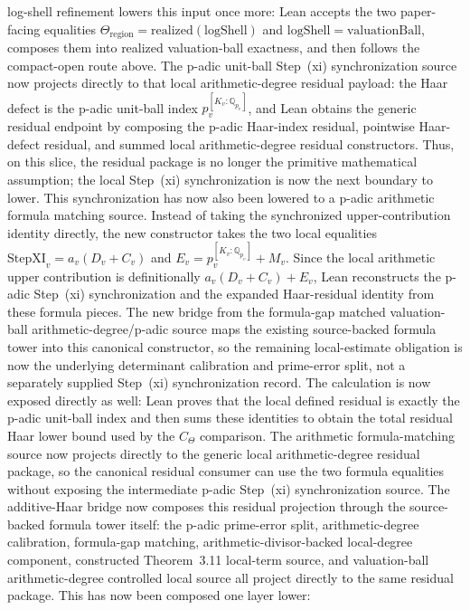 \documentclass[11pt]{article}
\theoremstyle{plain}
\theoremstyle{definition}
\theoremstyle{remark}
\begin{document}
log-shell refinement lowers this input once more: Lean accepts the two
paper-facing equalities
\(\Theta_{\mathrm{region}}=\mathrm{realized}(\mathrm{logShell})\) and
\(\mathrm{logShell}=\mathrm{valuationBall}\), composes them into realized
valuation-ball exactness, and then follows the compact-open route above.
The p-adic unit-ball Step~(xi) synchronization source now projects directly to
that local arithmetic-degree residual payload: the Haar defect is the
p-adic unit-ball index \(p_v^{[K_v:\mathbb Q_{p_v}]}\), and Lean obtains the
generic residual endpoint by composing the p-adic Haar-index residual,
pointwise Haar-defect residual, and summed local arithmetic-degree residual
constructors.  Thus, on this slice, the residual package is no longer the
primitive mathematical assumption; the local Step~(xi) synchronization is now
the next boundary to lower.
This synchronization has now also been lowered to a p-adic arithmetic formula
matching source.  Instead of taking the synchronized upper-contribution
identity directly, the new constructor takes the two local equalities
\(\mathrm{StepXI}_v=a_v(D_v+C_v)\) and
\(E_v=p_v^{[K_v:\mathbb Q_{p_v}]}+M_v\).  Since the local arithmetic upper
contribution is definitionally \(a_v(D_v+C_v)+E_v\), Lean reconstructs the
p-adic Step~(xi) synchronization and the expanded Haar-residual identity from
these formula pieces.  The new bridge from the formula-gap matched
valuation-ball arithmetic-degree/p-adic source maps the existing source-backed
formula tower into this canonical constructor, so the remaining local-estimate
obligation is now the underlying determinant calibration and prime-error split,
not a separately supplied Step~(xi) synchronization record.
The calculation is now exposed directly as well: Lean proves that the local
defined residual is exactly the p-adic unit-ball index and then sums these
identities to obtain the total residual Haar lower bound used by the
\(C_\Theta\) comparison.  The arithmetic formula-matching source now projects
directly to the generic local arithmetic-degree residual package, so the
canonical residual consumer can use the two formula equalities without
exposing the intermediate p-adic Step~(xi) synchronization source.  The
additive-Haar bridge now composes this residual projection through the
source-backed formula tower itself: the p-adic prime-error split,
arithmetic-degree calibration, formula-gap matching, arithmetic-divisor-backed
local-degree component, constructed Theorem~3.11 local-term source, and
valuation-ball arithmetic-degree controlled local source all project directly
to the same residual package.  This has now been composed one layer lower:
\end{document}
